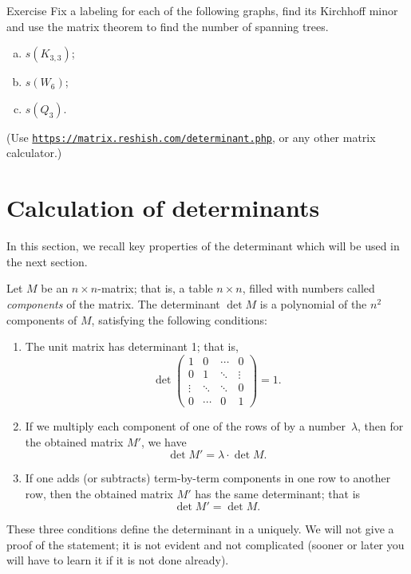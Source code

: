 \begin{thm}{Exercise}\label{ex:K33W6Q3}
Fix a labeling for each of the following graphs, 
find its Kirchhoff minor and use the matrix theorem to find the number of spanning trees.
\begin{enumerate}[(a)]
\item $s(K_{3,3})$;
\item $s(W_6)$;
\item $s(Q_3)$.
\end{enumerate}
(Use \href{https://matrix.reshish.com/determinant.php}{\texttt{https://matrix.reshish.com/determinant.php}}, or any other matrix calculator.)
\end{thm}


\section{Calculation of determinants}

In this section, we recall key properties of the determinant which will be used in the next section.

Let $M$ be an $n{\times}n$-matrix; that is, a table $n{\times}n$, filled with numbers called {}\emph{components} of the matrix.
The determinant $\det M$ is a polynomial of the $n^2$ components of $M$, satisfying the following conditions:
\begin{enumerate}
 \item\label{1} The unit matrix has determinant 1; that is,
\[
\det\left(
\begin{matrix}
1&0&\cdots&0
\\
0&1&\ddots&\vdots
\\
\vdots&\ddots&\ddots&0
\\
0&\cdots&0&1
\end{matrix}
\right)=1.
\]
\item\label{2} If we multiply each component of one of the rows of  by a number~$\lambda$, then for the obtained matrix $M'$, we have
\[\det M'=\lambda\cdot \det M.\]

\item\label{3} If one adds (or subtracts) term-by-term components
in one row to another row, then the obtained matrix $M'$ has the same determinant; that is
\[\det M'= \det M.\]
\end{enumerate}
These three conditions define the determinant in a uniquely. 
We will not give a proof of the statement; it is not evident and not complicated (sooner or later you will have to learn it if it is not done already).

